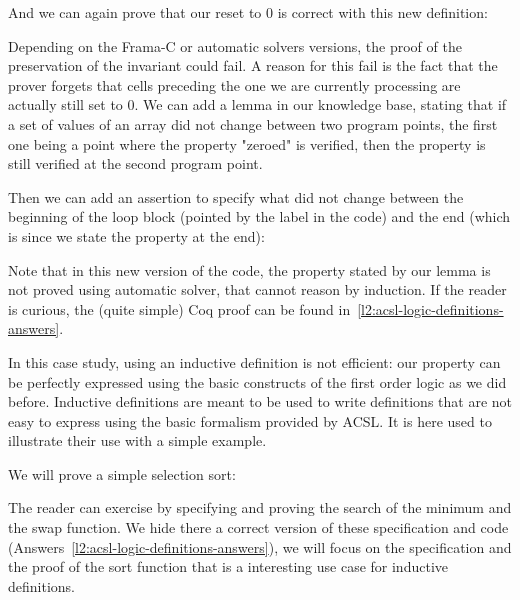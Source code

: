 And we can again prove that our reset to 0 is correct with this new
definition:


Depending on the Frama-C or automatic solvers versions, the proof of the
preservation of the invariant could fail. A reason for this fail is the fact that
the prover forgets that cells preceding the one we are currently processing
are actually still set to 0. We can add a lemma in our knowledge base, stating
that if a set of values of an array did not change between two program points,
the first one being a point where the property "zeroed" is verified, then the
property is still verified at the second program point.




Then we can add an assertion to specify what did not change between the
beginning of the loop block (pointed by the label  in the code)
and the end (which is  since we state the property at the end):




Note that in this new version of the code, the property stated by our lemma is
not proved using automatic solver, that cannot reason by induction. If the
reader is curious, the (quite simple) Coq proof can be found
in~\ref{l2:acsl-logic-definitions-answers}.


In this case study, using an inductive definition is not efficient: our
property can be perfectly expressed using the basic constructs of the first
order logic as we did before. Inductive definitions are meant to be used to
write definitions that are not easy to express using the basic formalism
provided by ACSL. It is here used to illustrate their use with a simple
example.



\label{l3:acsl-logic-definitions-inductive-sort}


We will prove a simple selection sort:




The reader can exercise by specifying and proving the search of the minimum and
the swap function. We hide there a correct version of these specification and
code (Answers~\ref{l2:acsl-logic-definitions-answers}), we will focus on the
specification and the proof of the sort function that is a interesting use case
for inductive definitions.

